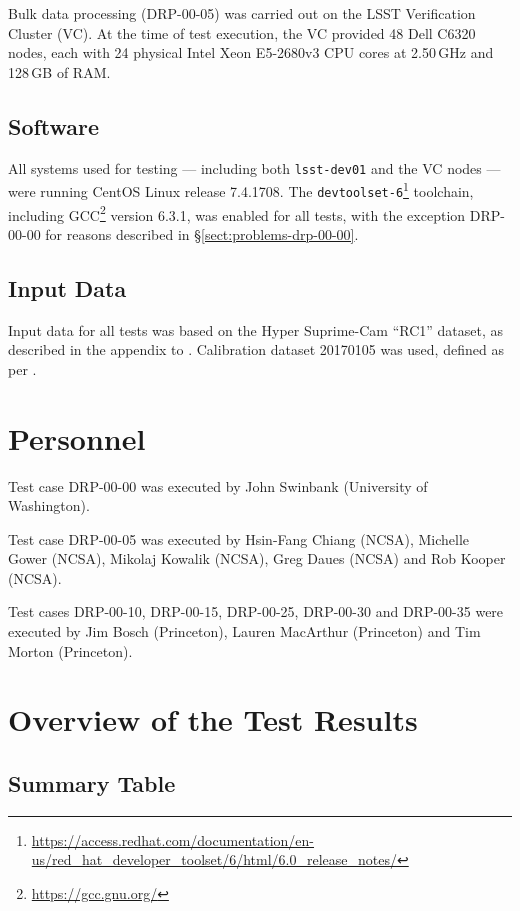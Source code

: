 \documentclass[DM,lsstdraft,STR,toc]{lsstdoc}
\begin{document}
Bulk data processing (DRP-00-05) was carried out on the LSST Verification Cluster (VC).
At the time of test execution, the VC provided 48 Dell C6320 nodes, each with 24 physical Intel Xeon E5-2680v3 CPU cores at 2.50\,GHz and 128\,GB of RAM.

\subsection{Software}
\label{sect:swconf}

All systems used for testing --- including both \texttt{lsst-dev01} and the VC nodes --- were running CentOS Linux release 7.4.1708.
The \texttt{devtoolset-6}\footnote{\url{https://access.redhat.com/documentation/en-us/red_hat_developer_toolset/6/html/6.0_release_notes/}} toolchain, including GCC\footnote{\url{https://gcc.gnu.org/}} version 6.3.1, was enabled for all tests, with the exception DRP-00-00 for reasons described in \S\ref{sect:problems-drp-00-00}.

\subsection{Input Data}
\label{sect:inputdata}

Input data for all tests was based on the Hyper Suprime-Cam “RC1” dataset, as described in the appendix to .
Calibration dataset 20170105 was used, defined as per .

\section{Personnel}
\label{sect:personnel}

Test case DRP-00-00 was executed by John Swinbank (University of Washington).

Test case DRP-00-05 was executed by Hsin-Fang Chiang (NCSA), Michelle Gower (NCSA), Mikolaj Kowalik (NCSA), Greg Daues (NCSA) and Rob Kooper (NCSA).

Test cases DRP-00-10, DRP-00-15, DRP-00-25, DRP-00-30 and DRP-00-35 were executed by Jim Bosch (Princeton), Lauren MacArthur (Princeton) and Tim Morton (Princeton).

\newpage

\section{Overview of the Test Results}
\label{sect:overview}

\subsection{Summary Table}
\label{sect:summarytable}
\end{document}
